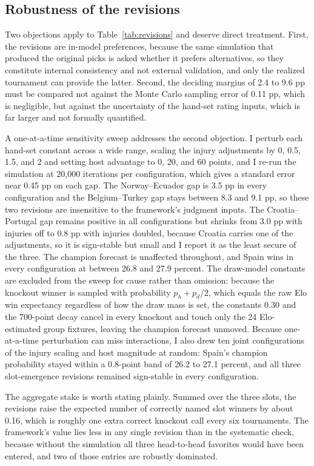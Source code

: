 \documentclass[11pt,letterpaper]{article}
\begin{document}
\subsection{Robustness of the revisions}\label{sec:robust}

Two objections apply to Table~\ref{tab:revisions} and deserve direct treatment. First, the revisions are in-model preferences, because the same simulation that produced the original picks is asked whether it prefers alternatives, so they constitute internal consistency and not external validation, and only the realized tournament can provide the latter. Second, the deciding margins of 2.4 to 9.6 pp must be compared not against the Monte Carlo sampling error of 0.11 pp, which is negligible, but against the uncertainty of the hand-set rating inputs, which is far larger and not formally quantified.

A one-at-a-time sensitivity sweep addresses the second objection. I perturb each hand-set constant across a wide range, scaling the injury adjustments by 0, 0.5, 1.5, and 2 and setting host advantage to 0, 20, and 60 points, and I re-run the simulation at 20{,}000 iterations per configuration, which gives a standard error near 0.45 pp on each gap. The Norway--Ecuador gap is 3.5 pp in every configuration and the Belgium--Turkey gap stays between 8.3 and 9.1 pp, so these two revisions are insensitive to the framework's judgment inputs. The Croatia--Portugal gap remains positive in all configurations but shrinks from 3.0 pp with injuries off to 0.8 pp with injuries doubled, because Croatia carries one of the adjustments, so it is sign-stable but small and I report it as the least secure of the three. The champion forecast is unaffected throughout, and Spain wins in every configuration at between 26.8 and 27.9 percent. The draw-model constants are excluded from the sweep for cause rather than omission: because the knockout winner is sampled with probability $p_h + p_d/2$, which equals the raw Elo win expectancy regardless of how the draw mass is set, the constants $0.30$ and the 700-point decay cancel in every knockout and touch only the 24 Elo-estimated group fixtures, leaving the champion forecast unmoved. Because one-at-a-time perturbation can miss interactions, I also drew ten joint configurations of the injury scaling and host magnitude at random: Spain's champion probability stayed within a 0.8-point band of 26.2 to 27.1 percent, and all three slot-emergence revisions remained sign-stable in every configuration.

The aggregate stake is worth stating plainly. Summed over the three slots, the revisions raise the expected number of correctly named slot winners by about 0.16, which is roughly one extra correct knockout call every six tournaments. The framework's value lies less in any single revision than in the systematic check, because without the simulation all three head-to-head favorites would have been entered, and two of those entries are robustly dominated.
\end{document}
